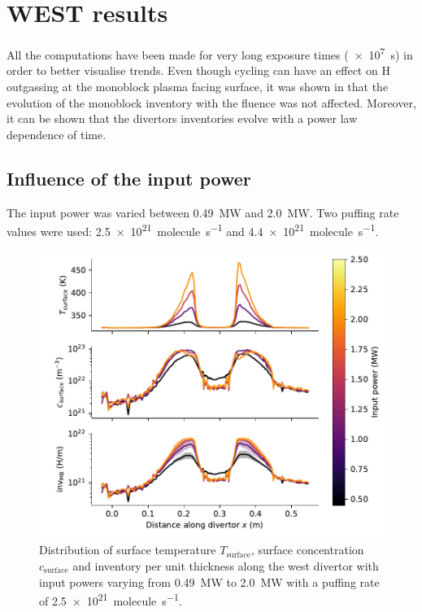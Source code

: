 \section{WEST results}

All the computations have been made for very long exposure times (\SI{e7}{s}) in order to better visualise trends.
Even though cycling can have an effect on \gls{H} outgassing at the \gls{monoblock} plasma facing surface, it was shown in  that the evolution of the \gls{monoblock} \gls{inventory} with the fluence was not affected.
Moreover, it can be shown that the \glspl{divertor} inventories evolve with a power law dependence of time.

\subsection{Influence of the input power}

The input power was varied between \SI{0.49}{MW} and \SI{2.0}{MW}.
Two puffing rate values were used: \SI{2.5e21}{molecule.s^{-1}} and \SI{4.4e21}{molecule.s^{-1}}.

\begin{figure}[h]
    \centering
    \includegraphics[width=\linewidth]{Figures/Chapter4/WEST/inventory_along_divertor_input_power.pdf}
    \caption{Distribution of surface temperature $T_\mathrm{surface}$, surface concentration $c_\mathrm{surface}$ and \gls{inventory} per unit thickness along the \gls{west} \gls{divertor} with input powers varying from \SI{0.49}{MW} to \SI{2.0}{MW} with a puffing rate of \SI{2.5e21}{molecule.s^{-1}}.}
\end{figure}

